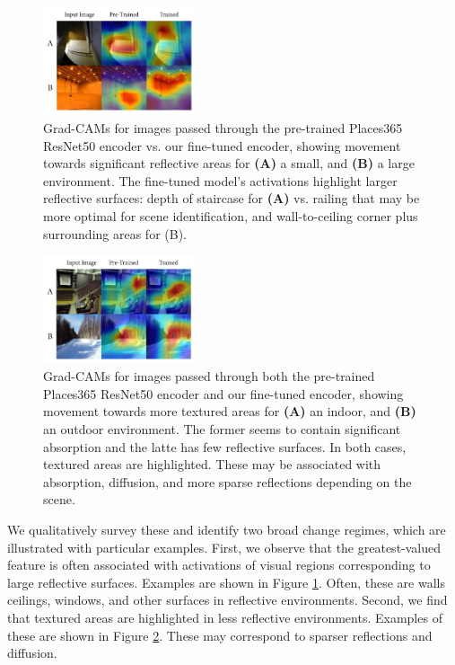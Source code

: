 \documentclass[10pt,twocolumn,letterpaper]{article}
\begin{document}
\begin{figure}[ht]
    \centering
    \includegraphics[width=0.4\textwidth]{gradcam_reflective.png}
    \caption{Grad-CAMs for images passed through the pre-trained Places365 ResNet50 encoder vs. our fine-tuned encoder, showing movement towards significant reflective areas for \textbf{(A)} a small, and \textbf{(B)} a large environment. The fine-tuned model's activations highlight larger reflective surfaces: depth of staircase for \textbf{(A)} vs. railing that may be more optimal for scene identification, and wall-to-ceiling corner plus surrounding areas for (B).}
    \label{fig:gradcam_reflective}
\end{figure}

\begin{figure}[ht]
    \centering
    \includegraphics[width=0.4\textwidth]{gradcam_textured.png}
    \caption{Grad-CAMs for images passed through both the pre-trained Places365 ResNet50 encoder and our fine-tuned encoder, showing movement towards more textured areas for \textbf{(A)} an indoor, and \textbf{(B)} an outdoor environment. The former seems to contain significant absorption and the latte has few reflective surfaces. In both cases, textured areas are highlighted. These may be associated with absorption, diffusion, and more sparse reflections depending on the scene.}
    \label{fig:gradcam_textured}
\end{figure}

We qualitatively survey these and identify two broad change regimes, which are illustrated with particular examples. First, we observe that the greatest-valued feature is often associated with activations of visual regions corresponding to large reflective surfaces. Examples are shown in Figure \ref{fig:gradcam_reflective}. Often, these are walls ceilings, windows, and other surfaces in reflective environments. Second, we find that textured areas are highlighted in less reflective environments. Examples of these are shown in Figure \ref{fig:gradcam_textured}. These may correspond to sparser reflections and diffusion.
\end{document}
